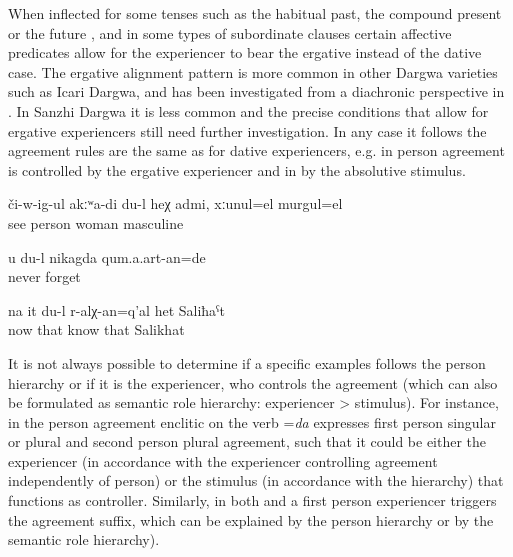 When inflected for some tenses such as the habitual past, the compound present  or the future ,  and in some types of subordinate clauses certain affective predicates allow for the experiencer to bear the ergative instead of the dative case. The ergative alignment pattern is more common in other Dargwa varieties such as Icari Dargwa, and has been investigated from a diachronic perspective in \citet{Ganenkov2013}. In Sanzhi Dargwa it is less common and the precise conditions that allow for ergative experiencers still need further investigation. In any case it follows the agreement rules are the same as for dative experiencers, e.g. in  person agreement is controlled by the ergative experiencer and in  by the absolutive stimulus. 
%
\begin{exe}
	\ex	\label{ex:I do not see this person, whether it is female or male}
	\gll	či-w-ig-ul	akːʷa-di	du-l	heχ	admi,	xːunul=el	murgul=el\\
		see				person		woman\tsc{=indq}		masculine\\
	\glt	{}
	
			\ex	\label{ex:‎‎I will never forget you}
	\gll	u	du-l	nikagda	qum.a.art-an=de\\
				never	forget\\
	\glt	{}
	
	\ex	\label{ex:I know her, this Salihat}
	\gll	na	it	du-l	r-alχ-an=q'al	het	Saliħaˁt\\
		now	that		know	that	Salikhat\\
	\glt	{}

\end{exe}



It is not always possible to determine if a specific examples follows the person hierarchy or if it is the experiencer, who controls the agreement (which can also be formulated as semantic role hierarchy: experiencer > stimulus). For instance, in  the person agreement enclitic on the verb =\textit{da} expresses first person singular or plural and second person plural agreement, such that it could be either the experiencer (in accordance with the experiencer controlling agreement independently of person) or the stimulus (in accordance with the hierarchy) that functions as controller. Similarly, in both  and  a first person experiencer triggers the agreement suffix, which can be explained by the person hierarchy or by the semantic role hierarchy). 


